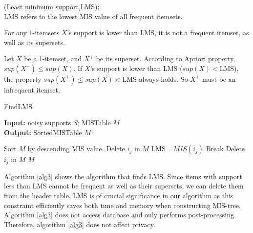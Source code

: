 \documentclass[conference]{IEEEtran}
\begin{document}
\begin{definition}{(Least minimum support,LMS):}\\
LMS refers to the lowest MIS value of all frequent itemsets.
\end{definition}
\begin{theorem}
For any 1-itemsets $X$'s support is lower than LMS, it is not a frequent itemset, as well as its supersets.
\label{th3}
\end{theorem}
\begin{IEEEproof}
Let $X$ be a 1-itemset, and $X^+$ be its superset.
According to Apriori property, $sup(X^+)\leq sup(X)$. 
If $X$'s support is lower than LMS ($sup(X)<$LMS), 
the property  $sup(X^+)\leq sup(X)<$LMS always holds. 
So $X^+$ must be an infrequent itemset.
\end{IEEEproof}

\begin{algorithm}[htbp]
    \caption{FindLMS}
    \hspace*{0.02in} {\bf Input:} %
    noisy supports $S$; MISTable $M$\\
    \hspace*{0.02in} {\bf Output:} %
    SortedMISTable $M$

    \begin{algorithmic}[1]
        \State Sort $M$ by descending MIS value.
        \State Delete $i_j$ in $M$
        \Else
        \State LMS= $MIS(i_j)$
        \State Break
        \EndIf
        \EndFor
        \State Delete $i_j$ in $M$
        \EndIf    
        \EndFor
        \State \Return $M$

    \end{algorithmic} 
    \label{alg3}
\end{algorithm}
Algorithm \ref{alg3} shows the algorithm that finds LMS.
Since items with support less than LMS cannot be frequent as well as their supersets, we can delete them from the header table.
LMS is of crucial significance in our algorithm as this constraint efficiently saves both time and memory when constructing MIS-tree.
Algorithm \ref{alg3} does not access database and only performs post-processing. Therefore, algorithm \ref{alg3} does not affect privacy.
\end{document}
